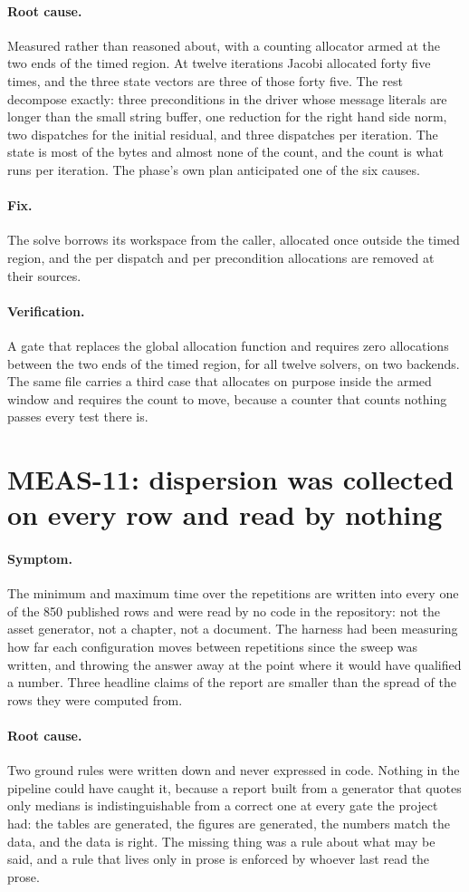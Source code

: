 \documentclass[11pt,a4paper]{report}
\newcommand{\symptom}[1]{\paragraph{Symptom.}#1}
\newcommand{\rootcause}[1]{\paragraph{Root cause.}#1}
\newcommand{\fix}[1]{\paragraph{Fix.}#1}
\newcommand{\verification}[1]{\paragraph{Verification.}#1}
\begin{document}
\rootcause{Measured rather than reasoned about, with a counting allocator armed
at the two ends of the timed region. At twelve iterations Jacobi allocated forty
five times, and the three state vectors are three of those forty five. The rest
decompose exactly: three preconditions in the driver whose message literals are
longer than the small string buffer, one reduction for the right hand side norm,
two dispatches for the initial residual, and three dispatches per iteration. The
state is most of the bytes and almost none of the count, and the count is what
runs per iteration. The phase's own plan anticipated one of the six causes.}

\fix{The solve borrows its workspace from the caller, allocated once outside the
timed region, and the per dispatch and per precondition allocations are removed
at their sources.}

\verification{A gate that replaces the global allocation function and requires
zero allocations between the two ends of the timed region, for all twelve
solvers, on two backends. The same file carries a third case that allocates on
purpose inside the armed window and requires the count to move, because a counter
that counts nothing passes every test there is.}

\section{MEAS-11: dispersion was collected on every row and read by nothing}

\symptom{The minimum and maximum time over the repetitions are written into every
one of the 850 published rows and were read by no code in the repository: not the
asset generator, not a chapter, not a document. The harness had been measuring
how far each configuration moves between repetitions since the sweep was written,
and throwing the answer away at the point where it would have qualified a number.
Three headline claims of the report are smaller than the spread of the rows they
were computed from.}

\rootcause{Two ground rules were written down and never expressed in code.
Nothing in the pipeline could have caught it, because a report built from a
generator that quotes only medians is indistinguishable from a correct one at
every gate the project had: the tables are generated, the figures are generated,
the numbers match the data, and the data is right. The missing thing was a rule
about what may be said, and a rule that lives only in prose is enforced by
whoever last read the prose.}
\end{document}
